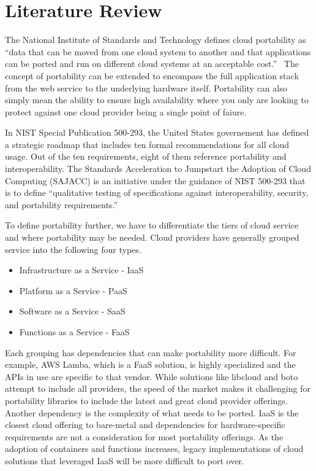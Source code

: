 \section{Literature Review}

The National Institute of Standards and Technology defines cloud  portability as ``data 
that can be moved from one cloud system to another and that  applications can be ported 
and run on different  cloud systems at an  acceptable cost.''~\cite{hid-sp18-518-NIST-291} 
The concept of portability can be extended to encompass the full application stack from
the web service to the underlying hardware itself. Portability can also simply mean the 
ability to ensure high availability where you only are looking to protect against one 
cloud provider being a single point of faiure.

In NIST Special Publication 500-293, the United States governement has
defined a strategic roadmap that includes ten formal recommendations
for all cloud usage. Out of the ten requirements, eight of them
reference portability and interoperability. The Standards Acceleration
to Jumpstart the Adoption of Cloud Computing (SAJACC) is an initiative
under the guidance of NIST 500-293 that is to define ``qualitative
testing of specifications against interoperability, security, and
portability requirements.''~\cite{hid-sp18-518-NIST-293}

To define portability further, we have to differentiate the tiers of cloud service and 
where portability may be needed. Cloud providers have generally grouped service into the
following four types.

\begin{itemize}
\item
  Infrastructure as a Service - IaaS
\item
  Platform as a Service - PaaS
\item
  Software as a Service - SaaS
\item
  Functions as a Service - FaaS
\end{itemize}

Each grouping has dependencies that can make portability more difficult. For example, AWS
Lamba, which is a FaaS solution, is highly specialized and the APIs in use are specific to
that vendor. While solutions like libcloud and boto attempt to include all providers, the 
speed of the market makes it challenging for portability libraries to include the latest 
and great cloud provider offerings.~\cite{hid-sp18-518-LibCloud} Another dependency is 
the complexity of what needs to be ported. IaaS is the closest cloud offering to 
bare-metal and dependencies for hardware-specific requirements are not a consideration 
for most portability offerings. As the adoption of containers and functions increases, 
legacy implementations of cloud solutions that leveraged IaaS will be more difficult to 
port over. 

